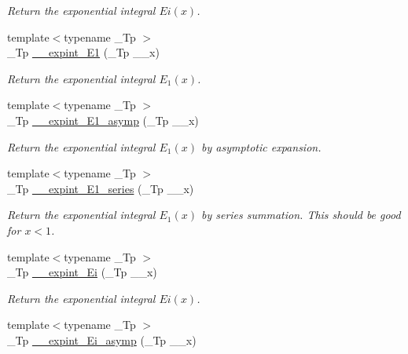 \begin{DoxyCompactItemize}
\begin{DoxyCompactList}\small\item\em Return the exponential integral $ Ei(x) $. \end{DoxyCompactList}\item 
{\footnotesize template$<$typename \+\_\+\+Tp $>$ }\\\+\_\+\+Tp \hyperlink{namespacestd_1_1____detail_a665eb0c524b929c035d88bbb17815917}{\+\_\+\+\_\+expint\+\_\+\+E1} (\+\_\+\+Tp \+\_\+\+\_\+x)
\begin{DoxyCompactList}\small\item\em Return the exponential integral $ E_1(x) $. \end{DoxyCompactList}\item 
{\footnotesize template$<$typename \+\_\+\+Tp $>$ }\\\+\_\+\+Tp \hyperlink{namespacestd_1_1____detail_abd02a300cd209be618a6e054a706c012}{\+\_\+\+\_\+expint\+\_\+\+E1\+\_\+asymp} (\+\_\+\+Tp \+\_\+\+\_\+x)
\begin{DoxyCompactList}\small\item\em Return the exponential integral $ E_1(x) $ by asymptotic expansion. \end{DoxyCompactList}\item 
{\footnotesize template$<$typename \+\_\+\+Tp $>$ }\\\+\_\+\+Tp \hyperlink{namespacestd_1_1____detail_ad162f66405bde5ccd5a7cdabbe1966f7}{\+\_\+\+\_\+expint\+\_\+\+E1\+\_\+series} (\+\_\+\+Tp \+\_\+\+\_\+x)
\begin{DoxyCompactList}\small\item\em Return the exponential integral $ E_1(x) $ by series summation. This should be good for $ x < 1 $. \end{DoxyCompactList}\item 
{\footnotesize template$<$typename \+\_\+\+Tp $>$ }\\\+\_\+\+Tp \hyperlink{namespacestd_1_1____detail_ab2f8bf37caa4993de28306a2a634ed6f}{\+\_\+\+\_\+expint\+\_\+\+Ei} (\+\_\+\+Tp \+\_\+\+\_\+x)
\begin{DoxyCompactList}\small\item\em Return the exponential integral $ Ei(x) $. \end{DoxyCompactList}\item 
{\footnotesize template$<$typename \+\_\+\+Tp $>$ }\\\+\_\+\+Tp \hyperlink{namespacestd_1_1____detail_ac272ec880c6d4be02b56089a1cebc46d}{\+\_\+\+\_\+expint\+\_\+\+Ei\+\_\+asymp} (\+\_\+\+Tp \+\_\+\+\_\+x)

\end{DoxyCompactItemize}
